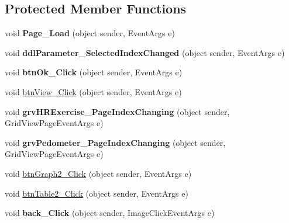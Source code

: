 \subsection*{Protected Member Functions}
\begin{DoxyCompactItemize}
\item 
\hypertarget{classusertrackmyhealth__fitness_a084e6a657729379d1e1c0dcd4fab8542}{void {\bfseries Page\-\_\-\-Load} (object sender, Event\-Args e)}\label{classusertrackmyhealth__fitness_a084e6a657729379d1e1c0dcd4fab8542}

\item 
\hypertarget{classusertrackmyhealth__fitness_af94cd22054deaa338c4fdc09dbcc6ee1}{void {\bfseries ddl\-Parameter\-\_\-\-Selected\-Index\-Changed} (object sender, Event\-Args e)}\label{classusertrackmyhealth__fitness_af94cd22054deaa338c4fdc09dbcc6ee1}

\item 
\hypertarget{classusertrackmyhealth__fitness_a6c08b71ac2885bb3a6e6c4900060fc81}{void {\bfseries btn\-Ok\-\_\-\-Click} (object sender, Event\-Args e)}\label{classusertrackmyhealth__fitness_a6c08b71ac2885bb3a6e6c4900060fc81}

\item 
void \hyperlink{classusertrackmyhealth__fitness_af3040cb8eb265fce39a5df86e1862c92}{btn\-View\-\_\-\-Click} (object sender, Event\-Args e)
\item 
\hypertarget{classusertrackmyhealth__fitness_ad0fdad154751d39fe41b9b25eb4bf4cf}{void {\bfseries grv\-H\-R\-Exercise\-\_\-\-Page\-Index\-Changing} (object sender, Grid\-View\-Page\-Event\-Args e)}\label{classusertrackmyhealth__fitness_ad0fdad154751d39fe41b9b25eb4bf4cf}

\item 
\hypertarget{classusertrackmyhealth__fitness_ae7c4ee1e2d42c0b13a4ed93b3d21138e}{void {\bfseries grv\-Pedometer\-\_\-\-Page\-Index\-Changing} (object sender, Grid\-View\-Page\-Event\-Args e)}\label{classusertrackmyhealth__fitness_ae7c4ee1e2d42c0b13a4ed93b3d21138e}

\item 
void \hyperlink{classusertrackmyhealth__fitness_a4b8061ccf379febfbfa8489b0ac7fbc6}{btn\-Graph2\-\_\-\-Click} (object sender, Event\-Args e)
\item 
void \hyperlink{classusertrackmyhealth__fitness_a212adaabdd57628bcccba7f4ace481a0}{btn\-Table2\-\_\-\-Click} (object sender, Event\-Args e)
\item 
\hypertarget{classusertrackmyhealth__fitness_ad326db8496f0a504a7418b95a215ca62}{void {\bfseries back\-\_\-\-Click} (object sender, Image\-Click\-Event\-Args e)}\label{classusertrackmyhealth__fitness_ad326db8496f0a504a7418b95a215ca62}


\end{DoxyCompactItemize}

